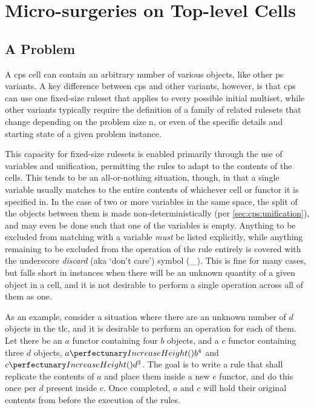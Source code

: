 \section{Micro-surgeries on  Top-level Cells}
\subsection{A Problem}
A \gls{cps} cell can contain an arbitrary number of various objects, like other \gls{ps} variants.  A key difference between \gls{cps} and other variants, however, is that \gls{cps} can use one fixed-size \gls{ruleset} that applies to every possible initial multiset, while other variants typically require the definition of a family of related \glspl{ruleset} that change depending on the problem size n, or even of the specific details and starting state of a given problem instance.

This capacity for fixed-size \glspl{ruleset} is enabled primarily through the use of variables and unification, permitting the rules to adapt to the contents of the cells.  This tends to be an all-or-nothing situation, though, in that a single variable usually matches to the entire contents of whichever cell or functor it is specified in.  In the case of two or more variables in the same space, the split of the objects between them is made non-deterministically (per \cref{sec:cps:unification}), and may even be done such that one of the variables is empty.  Anything to be excluded from matching with a variable \emph{must} be listed explicitly, while anything remaining to be excluded from the operation of the rule entirely is covered with the underscore \emph{discard} (aka `don't care') symbol (\(\_\)).  This is fine for many cases, but falls short in instances when there will be an unknown quantity of a given object in a cell, and it is not desirable to perform a single operation across all of them as one.

As an example, consider a situation where there are an unknown number of \(d\) objects in the \gls{tlc}, and it is desirable to perform an operation for each of them.  Let there be an \(a\) functor containing four \(b\) objects, and a \(c\) functor containing three \(d\) objects, \ie{} \(\cpfunc{a}{b^4}\) and \(\cpfunc{c}{d^3}\).  The goal is to write a rule that shall replicate the contents of \(a\) and place them inside a new \(e\) functor, and do this once per \(d\) present inside \(c\).  Once completed, \(a\) and \(c\) will hold their original contents from before the execution of the rules.

